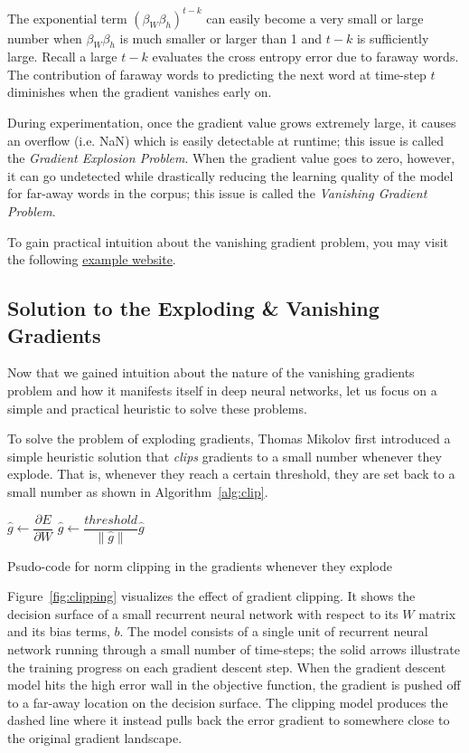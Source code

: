 \documentclass{tufte-handout}
\begin{document}
The exponential term $(\beta_W \beta_h)^{t-k}$ can easily become a very small or large number when $\beta_W \beta_h$ is much smaller or larger than 1 and $t-k$ is sufficiently large. Recall a large $t-k$ evaluates the cross entropy error due to faraway words. The contribution of faraway words to predicting the next word at time-step $t$ diminishes when the gradient vanishes early on.

During experimentation, once the gradient value grows extremely large, it causes an overflow (i.e. NaN) which is easily detectable at runtime; this issue is called the \textit{Gradient Explosion Problem}. When the gradient value goes to zero, however, it can go undetected while drastically reducing the learning quality of the model for far-away words in the corpus; this issue is called the \textit{Vanishing Gradient Problem}.

To gain practical intuition about the vanishing gradient problem, you may visit the following \uline{\href{http://cs224d.stanford.edu/notebooks/vanishing_grad_example.html}{example website}}.

\subsection{Solution to the Exploding \& Vanishing Gradients}
Now that we gained intuition about the nature of the vanishing gradients problem and how it manifests itself in deep neural networks, let us focus on a simple and practical heuristic to solve these problems.

To solve the problem of exploding gradients, Thomas Mikolov first introduced a simple heuristic solution that \textit{clips} gradients to a small number whenever they explode. That is, whenever they reach a certain threshold, they are set back to a small number as shown in Algorithm~\ref{alg:clip}.

\begin{algorithm}
\begin{algorithmic}
\State $\hat{g} \gets \dfrac{\partial E}{\partial W}$
    \State $\hat{g} \gets \dfrac{threshold}{\parallel \hat{g} \parallel} \hat{g}$
\EndIf
\end{algorithmic}
\caption{Psudo-code for norm clipping in the gradients whenever they explode}
\label{alg:clip}
\end{algorithm}

Figure~\ref{fig:clipping} visualizes the effect of gradient clipping. It shows the decision surface of a small recurrent neural network with respect to its $W$ matrix and its bias terms, $b$. The model consists of a single unit of recurrent neural network running through a small number of time-steps; the solid arrows illustrate the training progress on each gradient descent step. When the gradient descent model hits the high error wall in the objective function, the gradient is pushed off to a far-away location on the decision surface. The clipping model produces the dashed line where it instead pulls back the error gradient to somewhere close to the original gradient landscape.
\end{document}
